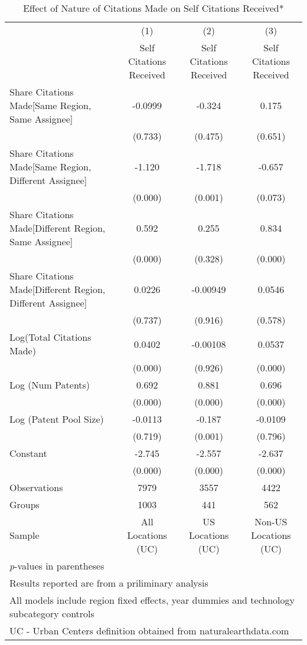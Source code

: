 {
\begin{longtable}{l*{3}{c}}
\caption{Effect of Nature of Citations Made on Self Citations Received*  \label{model131415}}\\
\hline\hline\endfirsthead\hline\endhead\hline\endfoot\endlastfoot
                &\multicolumn{1}{c}{(1)}&\multicolumn{1}{c}{(2)}&\multicolumn{1}{c}{(3)}\\
                &\multicolumn{1}{c}{Self Citations Received}&\multicolumn{1}{c}{Self Citations Received}&\multicolumn{1}{c}{Self Citations Received}\\
\hline
Share Citations Made[Same Region, Same Assignee]&  -0.0999&   -0.324&    0.175\\
                &  (0.733)&  (0.475)&  (0.651)\\
Share Citations Made[Same Region, Different Assignee]&   -1.120&   -1.718&   -0.657\\
                &  (0.000)&  (0.001)&  (0.073)\\
Share Citations Made[Different Region, Same Assignee]&    0.592&    0.255&    0.834\\
                &  (0.000)&  (0.328)&  (0.000)\\
Share Citations Made[Different Region, Different Assignee]&   0.0226& -0.00949&   0.0546\\
                &  (0.737)&  (0.916)&  (0.578)\\
Log(Total Citations Made)&   0.0402& -0.00108&   0.0537\\
                &  (0.000)&  (0.926)&  (0.000)\\
Log (Num Patents)&    0.692&    0.881&    0.696\\
                &  (0.000)&  (0.000)&  (0.000)\\
Log (Patent Pool Size)&  -0.0113&   -0.187&  -0.0109\\
                &  (0.719)&  (0.001)&  (0.796)\\
Constant        &   -2.745&   -2.557&   -2.637\\
                &  (0.000)&  (0.000)&  (0.000)\\
\hline
Observations    &     7979&     3557&     4422\\
Groups          &     1003&      441&      562\\
Sample          &All Locations (UC)&US Locations (UC)&Non-US Locations (UC)\\
\hline\hline
\multicolumn{4}{l}{\footnotesize \textit{p}-values in parentheses}\\
\multicolumn{4}{l}{\footnotesize * Results reported are from a priliminary analysis}\\
\multicolumn{4}{l}{\footnotesize All models include region fixed effects, year dummies and technology subcategory controls}\\
\multicolumn{4}{l}{\footnotesize UC - Urban Centers definition obtained from naturalearthdata.com}\\
\end{longtable}
}
